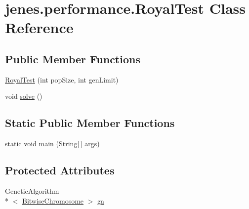\hypertarget{classjenes_1_1performance_1_1_royal_test}{\section{jenes.\-performance.\-Royal\-Test Class Reference}
\label{classjenes_1_1performance_1_1_royal_test}
}
\subsection*{Public Member Functions}
\begin{DoxyCompactItemize}
\item 
\hyperlink{classjenes_1_1performance_1_1_royal_test_a07b3000deb54543974d475d6acf38243}{Royal\-Test} (int pop\-Size, int gen\-Limit)
\item 
void \hyperlink{classjenes_1_1performance_1_1_royal_test_a4338b121c1d581f022691a2db6d53e55}{solve} ()
\end{DoxyCompactItemize}
\subsection*{Static Public Member Functions}
\begin{DoxyCompactItemize}
\item 
static void \hyperlink{classjenes_1_1performance_1_1_royal_test_a9af2c54a5edd971c03fec8e3b5f0f8c3}{main} (String\mbox{[}$\,$\mbox{]} args)
\end{DoxyCompactItemize}
\subsection*{Protected Attributes}
\begin{DoxyCompactItemize}
\item 
Genetic\-Algorithm\\*
$<$ \hyperlink{classjenes_1_1chromosome_1_1_bitwise_chromosome}{Bitwise\-Chromosome} $>$ \hyperlink{classjenes_1_1performance_1_1_royal_test_a1b996f1c7dd63921753d3e5d70261eb5}{ga}
\end{DoxyCompactItemize}


